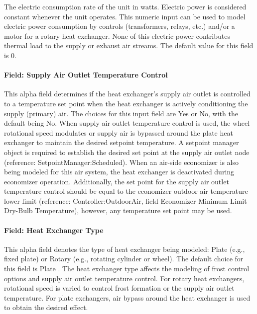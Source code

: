 The electric consumption rate of the unit in watts. Electric power is considered constant whenever the unit operates. This numeric input can be used to model electric power consumption by controls (transformers, relays, etc.) and/or a motor for a rotary heat exchanger. None of this electric power contributes thermal load to the supply or exhaust air streams. The default value for this field is 0.

\paragraph{Field: Supply Air Outlet Temperature Control}\label{field-supply-air-outlet-temperature-control}

This alpha field determines if the heat exchanger's supply air outlet is controlled to a temperature set point when the heat exchanger is actively conditioning the supply (primary) air. The choices for this input field are Yes or No, with the default being No. When supply air outlet temperature control is used, the wheel rotational speed modulates or supply air is bypassed around the plate heat exchanger to maintain the desired setpoint temperature. A setpoint manager object is required to establish the desired set point at the supply air outlet node (reference: SetpointManager:Scheduled). When an air-side economizer is also being modeled for this air system, the heat exchanger is deactivated during economizer operation. Additionally, the set point for the supply air outlet temperature control should be equal to the economizer outdoor air temperature lower limit (reference: Controller:OutdoorAir, field Economizer Minimum Limit Dry-Bulb Temperature), however, any temperature set point may be used.

\paragraph{Field: Heat Exchanger Type}\label{field-heat-exchanger-type}

This alpha field denotes the type of heat exchanger being modeled: Plate (e.g., fixed plate) or Rotary (e.g., rotating cylinder or wheel). The default choice for this field is Plate . The heat exchanger type affects the modeling of frost control options and supply air outlet temperature control. For rotary heat exchangers, rotational speed is varied to control frost formation or the supply air outlet temperature. For plate exchangers, air bypass around the heat exchanger is used to obtain the desired effect.

